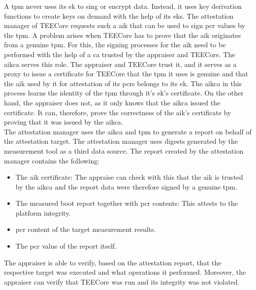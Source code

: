 A \gls{tpm} never uses its \gls{ek} to sing or encrypt data. Instead, it uses
key derivation functions to create keys on demand with the help of its
\glspl{ek}. The attestation manager of TEECore requests such a \gls{aik} that
can be used to sign \gls{pcr} values by the \gls{tpm}. A problem arises when
TEECore has to prove that the \gls{aik} originates from a genuine \gls{tpm}. For
this, the signing processes for the \gls{aik} need to be performed with the help
of a \gls{ca} trusted by the appraiser and TEECore. The \gls{aikca} serves this
role. The appraiser and TEECore trust it, and it serves as a proxy to issue a
certificate for TEECore that the \gls{tpm} it uses is genuine and that the
\gls{aik} used by it for attestation of its \glspl{pcr} belongs to its \gls{ek}.
The \gls{aikca} in this process learns the identity of the \gls{tpm} through
it's \gls{ek}'s certificate. On the other hand, the appraiser does not, as it
only knows that the \gls{aikca} issued the certificate. It can, therefore, prove
the correctness of the \gls{aik}'s certificate by proving that it was issued by
the \gls{aikca}.\\

The attestation manager uses the \gls{aikca} and \gls{tpm} to generate a report
on behalf of the attestation target. The attestation manager uses digests
generated by the measurement tool as a third data source. The report created by
the attestation manager contains the following:
\begin{itemize}
  \item The \gls{aik} certificate: The appraise can check with this that the
    \gls{aik} is trusted by the \gls{aikca} and the report data were
    therefore signed by a genuine \gls{tpm}.
  \item The measured boot report together with \gls{pcr} contents: This attests
    to the platform integrity.
  \item \gls{pcr} content of the target measurement results.
  \item The \gls{pcr} value of the report itself.
\end{itemize}

The appraiser is able to verify, based on the attestation report, that the
respective target was executed and what operations it performed. Moreover, the
appraiser can verify that TEECore was run and its integrity was not
violated.

